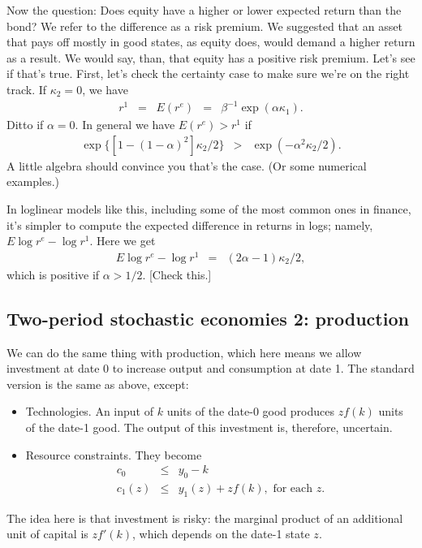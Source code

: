 \documentclass[11pt]{article}
\begin{document}
Now the question:  Does equity have a higher or lower expected return than the bond?
We refer to the difference as a risk premium.
We suggested that an asset that pays off mostly in good states,
as equity does, would demand a higher return as a result.
We would say, than, that equity has a positive risk premium.
Let's see if that's true.
First, let's check the certainty case to make sure we're on the right track.
If $\kappa_2 = 0$, we have
\begin{eqnarray*}
    r^1 \;\;=\;\; E(r^e)  &=&    \beta^{-1} \exp( \alpha \kappa_1 ) .
\end{eqnarray*}
Ditto if $\alpha = 0$.
In general we have $E(r^e) > r^1$ if
\begin{eqnarray*}
    \exp\{ [1 - (1-\alpha)^2] \kappa_2/2 \}
            &>& \exp(-\alpha^2 \kappa_2/2) .
\end{eqnarray*}
A little algebra should convince you that's the case.
(Or some numerical examples.)

In loglinear models like this,
including some of the most common ones in finance,
it's simpler to compute the expected difference in returns in logs;
namely, $ E \log r^e - \log r^1 $.
Here we get
\begin{eqnarray*}
    E \log r^e - \log r^1 &=& (2 \alpha - 1) \kappa_2 /2 ,
\end{eqnarray*}
which is positive if $\alpha > 1/2$.
[Check this.]



\subsection*{Two-period stochastic economies 2:  production}

We can do the same thing with production, which here means
we allow investment at date 0 to increase output and consumption
at date 1.
The standard version
is the same as above, except:
\begin{itemize}
\item Technologies.  An input of $k$ units of the date-0 good
produces $ z f(k)$ units of the date-1 good.
The output of this investment is, therefore, uncertain.
\item Resource constraints.  They become
\begin{eqnarray*}
    c_0 &\leq& y_0 - k \\
    c_1(z) &\leq& y_1(z) + z f(k), \mbox{ for each } z .
\end{eqnarray*}
\end{itemize}
The idea here is that investment is risky:  the marginal product
of an additional unit of capital is $z f'(k)$,
which depends on the date-1 state $z$.
\end{document}
